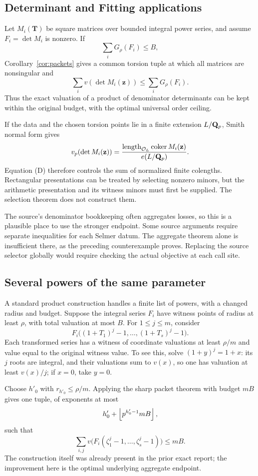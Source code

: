 \subsection{Determinant and Fitting applications}
Let \(M_i(\mathbf T)\) be square matrices over bounded integral power series, and assume \(F_i=\det M_i\) is nonzero. If
\[
 \sum_iG_\rho(F_i)\le B,
\]
Corollary~\ref{cor:packets} gives a common torsion tuple at which all matrices are nonsingular and
\[
 \sum_i v(\det M_i(\mathbf z))\le\sum_iG_\rho(F_i).
 \tag{D}
\]
Thus the exact valuation of a product of denominator determinants can be kept within the original budget, with the optimal universal order ceiling.

If the data and the chosen torsion points lie in a finite extension \(L/\mathbf Q_p\), Smith normal form gives
\[
 v_p(\det M_i(\mathbf z))
 =\frac{\operatorname{length}_{\mathcal O_L}
             \operatorname{coker}M_i(\mathbf z)}
        {e(L/\mathbf Q_p)}.
\]
Equation (D) therefore controls the sum of normalized finite colengths. Rectangular presentations can be treated by selecting nonzero minors, but the arithmetic presentation and its witness minors must first be supplied. The selection theorem does not construct them.

The source's denominator bookkeeping often aggregates losses, so this is a plausible place to use the stronger endpoint. Some source arguments require separate inequalities for each Selmer datum. The aggregate theorem alone is insufficient there, as the preceding counterexample proves. Replacing the source selector globally would require checking the actual objective at each call site.

\subsection{Several powers of the same parameter}
A standard product construction handles a finite list of powers, with a changed radius and budget. Suppose the integral series \(F_i\) have witness points of radius at least \(\rho\), with total valuation at most \(B\). For \(1\le j\le m\), consider
\[
 F_i\bigl((1+T_1)^j-1,\ldots,(1+T_s)^j-1\bigr).
\]
Each transformed series has a witness of coordinate valuations at least \(\rho/m\) and value equal to the original witness value. To see this, solve
\((1+y)^j=1+x\): its \(j\) roots are integral, and their valuations sum to \(v(x)\), so one has valuation at least \(v(x)/j\); if \(x=0\), take \(y=0\).

Choose \(h'_0\) with \(r_{h'_0}\le\rho/m\). Applying the sharp packet theorem with budget \(mB\) gives one tuple, of exponents at most
\[
 h'_0+\left\lfloor p^{h'_0-1}mB\right\rfloor,
\]
such that
\[
 \sum_{i,j}v\bigl(F_i(\zeta_1^j-1,\ldots,\zeta_s^j-1)\bigr)\le mB.
\]
The construction itself was already present in the prior exact report; the improvement here is the optimal underlying aggregate endpoint.


